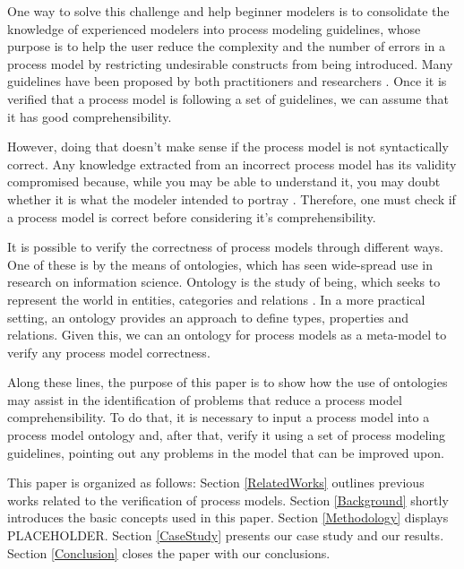 \documentclass[a4paper,twoside]{article}
\begin{document}
One way to solve this challenge and help beginner modelers is to consolidate the knowledge of experienced modelers into process modeling guidelines, whose purpose is to help the user reduce the complexity and the number of errors in a process model by restricting undesirable constructs from being introduced. Many guidelines have been proposed by both practitioners \cite{Silver2009} \cite{White2008} \cite{Allweyer2010} and researchers \cite{Becker2000} \cite{Mendling2007} \cite{Vanderfeesten2008} \cite{Correia2012}. Once it is verified that a process model is following a set of guidelines, we can assume that it has good comprehensibility.


However, %
doing that doesn't make sense if the process model is not syntactically correct. Any knowledge extracted from an incorrect process model has its validity compromised because, while you may be able to understand it, you may doubt whether it is what the modeler intended to portray \cite{Reijers2015}. Therefore, one must check if a process model is correct before considering it's comprehensibility.


It is possible to verify the correctness of process models through different ways. One of these is by the means of ontologies, which has seen wide-spread use in research on information science. Ontology is the study of being, which seeks to represent the world in entities, categories and relations \cite{Mendling2008}. In a more practical setting, an ontology provides an approach to define types, properties and relations. Given this, we can an ontology for process models as a meta-model to verify any process model correctness.


Along these lines, the purpose of this paper is to show how the use of ontologies may assist in the identification of problems that reduce a process model comprehensibility. To do that, it is necessary to input a process model into a process model ontology and, after that, verify it using a set of process modeling guidelines, pointing out any problems in the model that can be improved upon.


This paper is organized as follows: Section \ref{RelatedWorks} outlines previous works related to the verification of process models. Section \ref{Background} shortly introduces the basic concepts used in this paper. Section \ref{Methodology} displays PLACEHOLDER. Section \ref{CaseStudy} presents our case study and our results. Section \ref{Conclusion} closes the paper with our conclusions.
\end{document}
